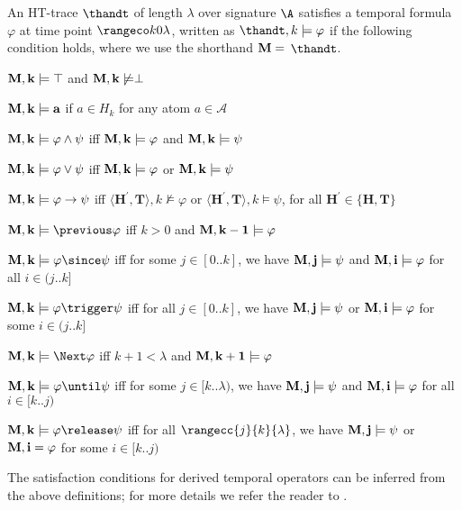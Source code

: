 \begin{definition}
  An HT-trace $\thandt$ of length $\lambda$ over signature $\A$
  satisfies a temporal formula $\varphi$ at time point
  $\kinlambda$, written as $\thandt,k \models \varphi$ if
  the following condition holds, where we use the shorthand
  $\bf{M} =$ $\thandt$.
\begin{description}
  \item $\bf{M},k \models \top$ and $\bf{M}, k \not \models \perp$
  \item $\bf{M},k \models a$ if $a \in H_{k}$ for any atom $a \in \mathcal{A}$
  \item $\bf{M},k \models \varphi \wedge \psi$ iff $\bf{M}, k \models \varphi$ and $\bf{M}, k \models \psi$
  \item $\bf{M},k \models \varphi \vee \psi$ iff $\bf{M}, k \models \varphi$ or $\bf{M}, k \models \psi$
  \item $\bf{M},k \models \varphi \rightarrow \psi$ iff 
    $\langle \bm{H}^{\prime},\bm{T} \rangle, k \not \models \varphi$ 
    or $\langle \bm{H}^{\prime},\bm{T} \rangle, k \models \psi$, 
    for all $\bm{H}^{\prime} \in\{\bm{H}, \bm{T}\}$
  \item $\bf{M},k \models \previous \varphi$ iff $k>0$ and $\bf{M},k-1 \models \varphi$
  \item $\bf{M},k \models \varphi \since \psi$ iff for some $j \in[0 . . k]$, we have $\bf{M}, j \models \psi$ and $\bf{M},i \models \varphi$ for all $i \in(j . . k]$
  \item $\bf{M},k \models \varphi \trigger \psi$ iff for all $j \in[0 . . k]$, we have $\bf{M}, j \models \psi$ or $\bf{M}, i \models \varphi$ for some $i \in(j . . k]$
  \item $\bf{M},k \models \Next \varphi$ iff $k+1<\lambda$ and $\bf{M}, k+1 \models \varphi$
  \item $\bf{M}, k \models \varphi \until \psi$ iff for some $j \in[k . . \lambda)$, we have $\bf{M}, j \models \psi$ and $\bf{M}, i \models \varphi$ for all $i \in[k . . j)$
  \item $\bf{M}, k \models \varphi \release \psi$ iff for all $\rangecc{j}{k}{\lambda}$, we have $\bf{M}, j \models \psi$ or $\bf{M},
    i=\varphi$ for some $i \in[k . . j)$
\end{description}
\end{definition}

The satisfaction conditions for derived temporal operators can be
inferred from the above definitions; for more details we refer the
reader to \cite{agcadipescscvi20a}.


